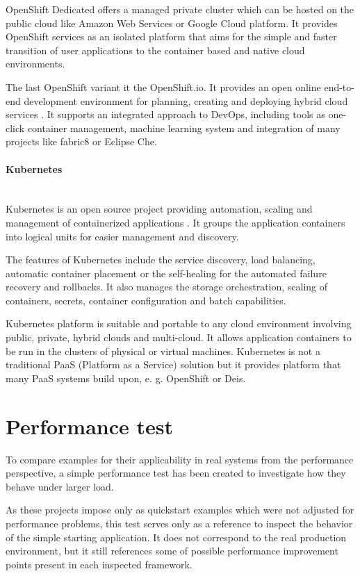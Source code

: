 \documentclass[oneside,
  digital, %
  table,   %
  nolof,     %
  nolot,     %
]{fithesis3}
\newcommand{\newlinepar}[1]{\paragraph{#1}\needspace{4\baselineskip}\mbox{}\\}
\begin{document}
OpenShift Dedicated offers a managed private cluster which can be hosted on the public cloud like Amazon Web Services or Google Cloud platform. It provides OpenShift services as an isolated platform that aims for the simple and faster transition of user applications to the container based and native cloud environments.

The last OpenShift variant it the OpenShift.io. It provides an open online end-to-end development environment for planning, creating and deploying hybrid cloud services \cite{openshift_io}. It supports an integrated approach to DevOps, including tools as one-click container management, machine learning system and integration of many projects like fabric8 or Eclipse Che.

\newlinepar{Kubernetes}

Kubernetes is an open source project providing automation, scaling and management of containerized applications \cite{kubernetes}. It groups the application containers into logical units for easier management and discovery.

The features of Kubernetes include the service discovery, load balancing, automatic container placement or the self-healing for the automated failure recovery and rollbacks. It also manages the storage orchestration, scaling of containers, secrets, container configuration and batch capabilities.

Kubernetes platform is suitable and portable to any cloud environment involving public, private, hybrid clouds and multi-cloud. It allows application containers to be run in the clusters of physical or virtual machines. Kubernetes is not a traditional PaaS (Platform as a Service) solution but it provides platform that many PaaS systems build upon, e. g. OpenShift or Deis.


\section{Performance test}

To compare examples for their applicability in real systems from the performance perspective, a simple performance test has been created to investigate how they behave under larger load.

As these projects impose only as quickstart examples which were not adjusted for performance problems, this test serves only as a reference to inspect the behavior of the simple starting application. It does not correspond to the real production environment, but it still references some of possible performance improvement points present in each inspected framework.
\end{document}
